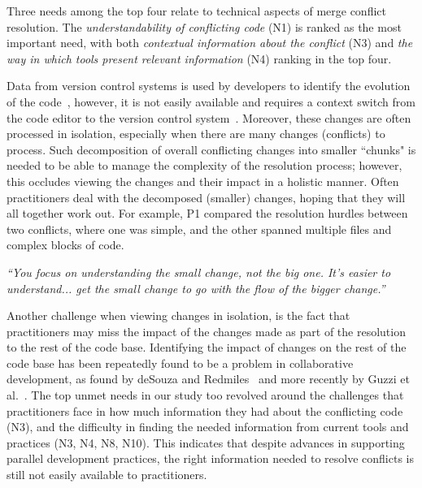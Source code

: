 Three needs among the top four relate to technical aspects of merge conflict resolution.
The \textit{understandability of conflicting code} (N1) is ranked as the most important need, with both \textit{contextual information about the conflict} (N3) and \textit{the way in which tools present relevant information} (N4) ranking in the top four.

Data from version control systems is used by developers to identify the evolution of the code~\cite{Mihai_lenses}, however, it is not easily available and requires a context switch from the code editor to the version control system~\cite{Guzzi2015}. Moreover, these changes are often processed in isolation, especially when there are many changes (conflicts) to process. Such decomposition of overall conflicting changes into smaller ``chunks" is needed to be able to manage the complexity of the resolution process; however, this occludes viewing the changes and their impact in a holistic manner. Often practitioners deal with the decomposed (smaller) changes, hoping that they will all together work out. For example, P1 compared the resolution hurdles between two conflicts, where one was simple, and the other spanned multiple files and complex blocks of code.
\begin{displayquote}
\textit{``You focus on understanding the small change, not the big one. It's easier to understand... get the small change to go with the flow of the bigger change.''}
\end{displayquote}

Another challenge when viewing changes in isolation, is the fact that practitioners may miss the impact of the changes made as part of the resolution to the rest of the code base. Identifying the impact of changes on the rest of the code base has been repeatedly found to be a problem in collaborative development, as found by deSouza and Redmiles~\cite{deSouza2008} and more recently by Guzzi et al.~\cite{Guzzi2015}. The top unmet needs in our study too revolved around the challenges that practitioners face in how much information they had about the conflicting code (N3), and the difficulty in finding the needed information from current tools and practices (N3, N4, N8, N10). This indicates that despite advances in supporting parallel development practices, the right information needed to resolve conflicts is still not easily available to practitioners. 

